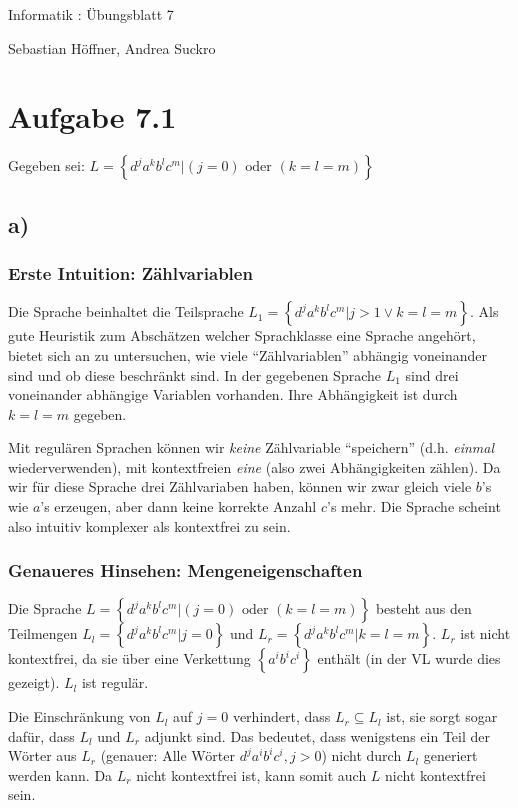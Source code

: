 \documentclass{article}
\begin{document}
\begin{center}
  \Large{Informatik \revD: Übungsblatt 7}

  \large{Sebastian Höffner, Andrea Suckro}
\end{center}



\section*{Aufgabe 7.1}
Gegeben sei: $L=\left\{d^ja^kb^lc^m | (j=0)\text{ oder }(k=l=m) \right\}$

\subsection*{a)}
\subsubsection*{Erste Intuition: Zählvariablen}
Die Sprache beinhaltet die Teilsprache $L_1=\left\{d^ja^kb^lc^m | j>1 \vee k=l=m \right\}$. Als gute Heuristik zum Abschätzen welcher Sprachklasse eine Sprache angehört, bietet sich an zu untersuchen, wie viele "`Zählvariablen"' abhängig voneinander sind und ob diese beschränkt sind. In der gegebenen Sprache $L_1$ sind drei voneinander abhängige Variablen vorhanden. Ihre Abhängigkeit ist durch $k=l=m$ gegeben. 

Mit regulären Sprachen können wir \emph{keine} Zählvariable "`speichern"' (d.h. \emph{einmal} wiederverwenden), mit kontextfreien \emph{eine} (also zwei Abhängigkeiten zählen). Da wir für diese Sprache drei Zählvariaben haben, können wir zwar gleich viele $b$'s wie $a$'s erzeugen, aber dann keine korrekte Anzahl $c$'s mehr. Die Sprache scheint also intuitiv komplexer als kontextfrei zu sein.

\subsubsection*{Genaueres Hinsehen: Mengeneigenschaften}
Die Sprache $L=\left\{d^ja^kb^lc^m | (j=0)\text{ oder }(k=l=m) \right\}$ besteht aus den Teilmengen $L_l=\left\{d^ja^kb^lc^m | j=0\right\}$ und $L_r=\left\{d^ja^kb^lc^m | k=l=m\right\}$. $L_r$ ist nicht kontextfrei, da sie über eine Verkettung $\left\{a^ib^ic^i\right\}$ enthält (in der VL wurde dies gezeigt). $L_l$ ist regulär.

Die Einschränkung von $L_l$ auf $j=0$ verhindert, dass $L_r \subseteq L_l$ ist, sie sorgt sogar dafür, dass $L_l$ und $L_r$ adjunkt sind. Das bedeutet, dass wenigstens ein Teil der Wörter aus $L_r$ (genauer: Alle Wörter $d^ja^ib^ic^i, j>0$) nicht durch $L_l$ generiert werden kann. Da $L_r$ nicht kontextfrei ist, kann somit auch $L$ nicht kontextfrei sein.
\end{document}
